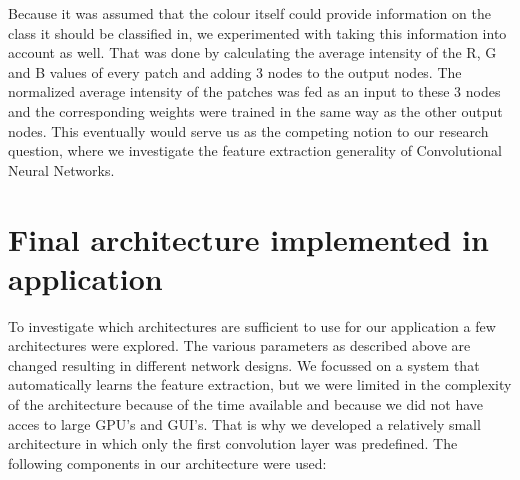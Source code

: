 \documentclass[a4paper,onecolumn]{report}
\begin{document}
Because it was assumed that the colour itself could provide information on the class it should be classified in, we experimented with taking this information into account as well. That was done by calculating the average intensity of the R, G and B values of every patch and adding 3 nodes to the output nodes. The normalized average intensity of the patches was fed as an input to these 3 nodes and the corresponding weights were trained in the same way as the other output nodes. This eventually would serve us as the competing notion to our research question, where we investigate the feature extraction generality of Convolutional Neural Networks. 

\section{Final architecture implemented in application}
\label{sec:finalimpl}
To investigate which architectures are sufficient to use for our application a few architectures were explored. The various parameters as described above are changed resulting in different network designs. We focussed on a system that automatically learns the feature extraction, but we were limited in the complexity of the architecture because of the time available and because we did not have acces to large GPU's and GUI's. That is why we developed a relatively small architecture in which only the first convolution layer was predefined. The following components in our architecture were used:
\end{document}
